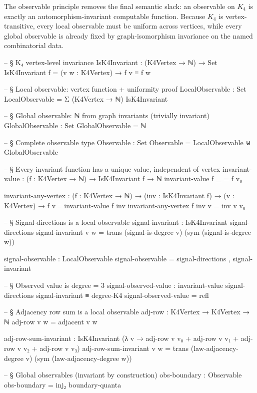\documentclass[11pt,a4paper]{book}
\begin{document}
The observable principle removes the final semantic slack: an observable on $K_4$ is exactly an automorphism-invariant computable function. Because $K_4$ is vertex-transitive, every local observable must be uniform across vertices, while every global observable is already fixed by graph-isomorphism invariance on the named combinatorial data.

\begin{code}
  -- § K₄ vertex-level invariance
  IsK4Invariant : (K4Vertex → ℕ) → Set
  IsK4Invariant f = (v w : K4Vertex) → f v ≡ f w

  -- § Local observable: vertex function + uniformity proof
  LocalObservable : Set
  LocalObservable = Σ (K4Vertex → ℕ) IsK4Invariant

  -- § Global observable: ℕ from graph invariants (trivially invariant)
  GlobalObservable : Set
  GlobalObservable = ℕ

  -- § Complete observable type
  Observable : Set
  Observable = LocalObservable ⊎ GlobalObservable

  -- § Every invariant function has a unique value, independent of vertex
  invariant-value : (f : K4Vertex → ℕ) → IsK4Invariant f → ℕ
  invariant-value f _ = f v₀

  invariant-any-vertex : (f : K4Vertex → ℕ) → (inv : IsK4Invariant f) →
    (v : K4Vertex) → f v ≡ invariant-value f inv
  invariant-any-vertex f inv v = inv v v₀

  -- § Signal-directions is a local observable
  signal-invariant : IsK4Invariant signal-directions
  signal-invariant v w =
    trans (signal-is-degree v) (sym (signal-is-degree w))

  signal-observable : LocalObservable
  signal-observable = signal-directions , signal-invariant

  -- § Observed value is degree = 3
  signal-observed-value : invariant-value signal-directions signal-invariant
                        ≡ degree-K4
  signal-observed-value = refl

  -- § Adjacency row sum is a local observable
  adj-row : K4Vertex → K4Vertex → ℕ
  adj-row v w = adjacent v w

  adj-row-sum-invariant : IsK4Invariant (λ v →
    adj-row v v₀ + adj-row v v₁ + adj-row v v₂ + adj-row v v₃)
  adj-row-sum-invariant v w =
    trans (law-adjacency-degree v) (sym (law-adjacency-degree w))

  -- § Global observables (invariant by construction)
  obs-boundary   : Observable
  obs-boundary   = inj₂ boundary-quanta


\end{code}
\end{document}
